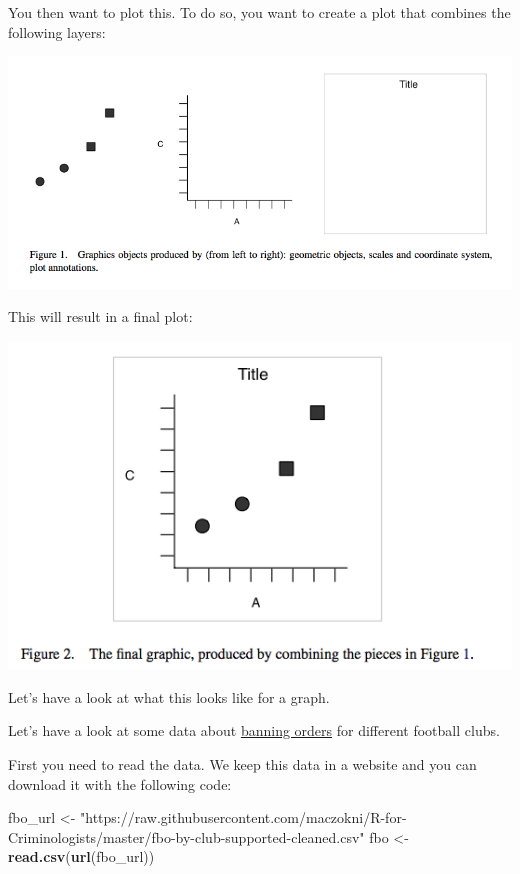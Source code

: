 \documentclass[]{book}
\newenvironment{Shaded}{\begin{snugshade}}{\end{snugshade}}
\newcommand{\KeywordTok}[1]{\textcolor[rgb]{0.13,0.29,0.53}{\textbf{#1}}}
\newcommand{\NormalTok}[1]{#1}
\newcommand{\StringTok}[1]{\textcolor[rgb]{0.31,0.60,0.02}{#1}}
\theoremstyle{definition}
\theoremstyle{definition}
\theoremstyle{definition}
\theoremstyle{remark}
\begin{document}
You then want to plot this. To do so, you want to create a plot that
combines the following layers:

\includegraphics{imgs/layers.png}

This will result in a final plot:

\includegraphics{imgs/combined.png}

Let's have a look at what this looks like for a graph.

Let's have a look at some data about
\href{https://www.gov.uk/government/publications/football-related-arrests-and-banning-orders-england-and-wales-season-2016-to-2017/football-related-arrests-and-banning-order-statistics-england-and-wales-2016-to-2017-season}{banning
orders} for different football clubs.

First you need to read the data. We keep this data in a website and you
can download it with the following code:

\begin{Shaded}
\begin{Highlighting}[]
\NormalTok{fbo_url <-}\StringTok{ "https://raw.githubusercontent.com/maczokni/R-for-Criminologists/master/fbo-by-club-supported-cleaned.csv"}
\NormalTok{fbo <-}\StringTok{ }\KeywordTok{read.csv}\NormalTok{(}\KeywordTok{url}\NormalTok{(fbo_url))}
\end{Highlighting}
\end{Shaded}
\end{document}
